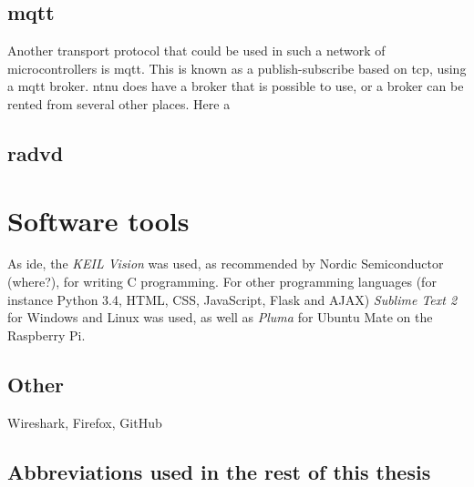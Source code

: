 \subsection{\gls{mqtt}}

Another transport protocol that could be used in such a network of microcontrollers is \gls{mqtt}. This is  known as a publish-subscribe based on \gls{tcp}, using a \gls{mqtt} broker. \gls{ntnu} does have a broker that is possible to use, or a broker can be rented from several other places. Here a 

\cite{hunkeler2008mqtt}

\subsection{\gls{radvd}}


\section{Software tools}

As \gls{ide}, the \textit{KEIL Vision} was used, as recommended by Nordic Semiconductor (where?), for writing C programming. For other programming languages (for instance Python 3.4, HTML, CSS, JavaScript, Flask and AJAX) \textit{Sublime Text 2} for Windows and Linux was used, as well as \textit{Pluma} for Ubuntu Mate on the Raspberry Pi. 

\subsection{Other}

Wireshark, Firefox, GitHub


\subsection{Abbreviations used in the rest of this thesis}




